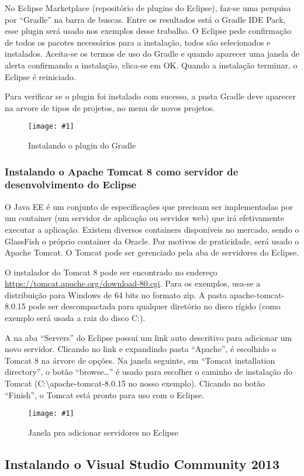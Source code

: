 \documentclass[a4paper,12pt]{article}
\newcommand{\figura}[2] {
	\begin{figure}[ht]
		\centering
		\texttt{[image: \#1]}
		\caption{#2}
	\end{figure}
	\FloatBarrier
}
\begin{document}
No Eclipse Marketplace (repositório de plugins do Eclipse), faz-se uma perquisa por “Gradle” na barra de buscas. Entre os resultados está o Gradle IDE Pack, esse plugin será usado nos exemplos desse trabalho. O Eclipse pede confirmação de todos os pacotes necessários para a instalação, todos são selecionados e instalados. Aceita-se os termos de uso do Gradle e quando aparecer uma janela de alerta confirmando a instalação, clica-se em OK. Quando a instalação terminar, o Eclipse é reiniciado.

Para verificar se o plugin foi instalado com sucesso, a pasta Gradle deve aparecer na arvore de tipos de projetos, no menu de novos projetos.

\figura{plugin1.png}{Instalando o plugin do Gradle}

\subsubsection{Instalando o Apache Tomcat 8 como servidor de desenvolvimento do Eclipse} 

O Java EE é um conjunto de especificações que precisam ser implementadas por um container (um servidor de aplicação ou servidor web) que irá efetivamente executar a aplicação. Existem diversos containers disponíveis no mercado, sendo o GlassFish o próprio container da Oracle. Por motivos de praticidade, será usado o Apache Tomcat. O Tomcat pode ser gerenciado pela aba de servidores do Eclipse.

O instalador do Tomcat 8 pode ser encontrado no endereço \url{https://tomcat.apache.org/download-80.cgi}. Para os exemplos, usa-se a distribuição para Windows de 64 bits no formato zip. A pasta apache-tomcat-8.0.15 pode ser descompactada para qualquer diretório no disco rígido (como exemplo será usada a raiz do disco C:). 

A na aba “Servers” do Eclipse possui um link auto descritivo para adicionar um novo servidor. Clicando no link e expandindo pasta “Apache”, é escolhido o Tomcat 8 na árvore de opções. Na janela seguinte, em “Tomcat installation directory”, o botão “browse\ldots” é usado para escolher o caminho de instalação do Tomcat (C:\textbackslash apache-tomcat-\textmd{8.0.15} no nosso exemplo). Clicando no botão “Finish”, o Tomcat está pronto para uso com o Eclipse.

\figura{tomcat1.png}{Janela pra adicionar servidores no Eclipse}

\subsection{Instalando o Visual Studio Community 2013} 
\end{document}
